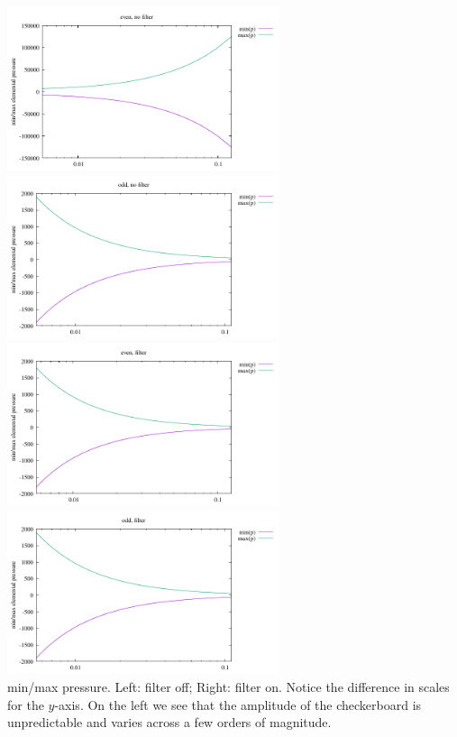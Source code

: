 \begin{center}
\includegraphics[width=8cm]{python_codes/fieldstone_12/results/ldc/rawp_even_nofilter}
\includegraphics[width=8cm]{python_codes/fieldstone_12/results/ldc/rawp_odd_nofilter}\\
\includegraphics[width=8cm]{python_codes/fieldstone_12/results/ldc/rawp_even_filter}
\includegraphics[width=8cm]{python_codes/fieldstone_12/results/ldc/rawp_odd_filter}\\
{\captionfont min/max pressure. Left: filter off; Right: filter on. Notice the 
difference in scales for the $y$-axis. On the left we see that the amplitude of the 
checkerboard is unpredictable and varies across a few orders of magnitude.}
\end{center}


